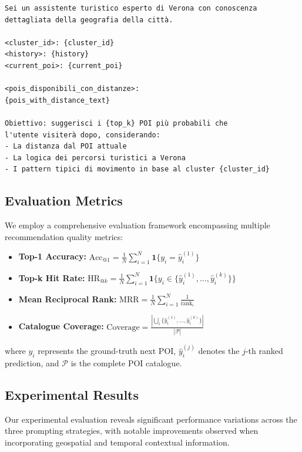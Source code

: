 \documentclass[12pt,a4paper]{article}
\begin{document}
\begin{lstlisting}[language=text, caption=Comprehensive Context Prompt Template]
Sei un assistente turistico esperto di Verona con conoscenza 
dettagliata della geografia della città.

<cluster_id>: {cluster_id}
<history>: {history}
<current_poi>: {current_poi}

<pois_disponibili_con_distanze>:
{pois_with_distance_text}

Obiettivo: suggerisci i {top_k} POI più probabili che 
l'utente visiterà dopo, considerando:
- La distanza dal POI attuale
- La logica dei percorsi turistici a Verona
- I pattern tipici di movimento in base al cluster {cluster_id}
\end{lstlisting}

\subsection{Evaluation Metrics}

We employ a comprehensive evaluation framework encompassing multiple recommendation quality metrics:

\begin{itemize}
\item \textbf{Top-1 Accuracy:} $\text{Acc}_{@1} = \frac{1}{N}\sum_{i=1}^{N}\mathbf{1}\{y_i = \hat{y}_i^{(1)}\}$
\item \textbf{Top-k Hit Rate:} $\text{HR}_{@k} = \frac{1}{N}\sum_{i=1}^{N}\mathbf{1}\{y_i \in \{\hat{y}_i^{(1)}, \ldots, \hat{y}_i^{(k)}\}\}$
\item \textbf{Mean Reciprocal Rank:} $\text{MRR} = \frac{1}{N}\sum_{i=1}^{N}\frac{1}{\text{rank}_i}$
\item \textbf{Catalogue Coverage:} $\text{Coverage} = \frac{|\bigcup_{i}\{\hat{y}_i^{(1)}, \ldots, \hat{y}_i^{(k)}\}|}{|\mathcal{P}|}$
\end{itemize}

where $y_i$ represents the ground-truth next POI, $\hat{y}_i^{(j)}$ denotes the $j$-th ranked prediction, and $\mathcal{P}$ is the complete POI catalogue.

\subsection{Experimental Results}

Our experimental evaluation reveals significant performance variations across the three prompting strategies, with notable improvements observed when incorporating geospatial and temporal contextual information.
\end{document}
